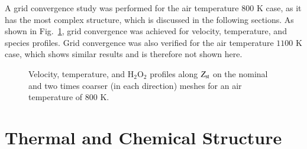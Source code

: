 \documentclass[review,3p,times]{elsarticle}
\begin{document}
\begin{table}
  \caption{Computational domain and number of grid points.}
  \label{table:domain}
  \centering
  \normalsize
\end{table}

A grid convergence study was performed for the air temperature $800$ K case, as it has the most complex structure, which is discussed in the following sections.  As shown in Fig.~\ref{fig:convergence}, grid convergence was achieved for velocity, temperature, and species profiles.  Grid convergence was also verified for the air temperature $1100$ K case, which shows similar results and is therefore not shown here.  

\begin{figure}
  \centering
  \scriptsize
  \hspace{-0.40625in}
  
  \hspace{-0.40625in}
  
  \hspace{-0.40625in}
  
  \normalsize
  \caption{Velocity, temperature, and H$_2$O$_2$ profiles along $Z_{\rm st}$ on the nominal and two times coarser (in each direction) meshes for an air temperature of $800$ K.}
  \label{fig:convergence}
\end{figure}



\section{Thermal and Chemical Structure} 
\end{document}
